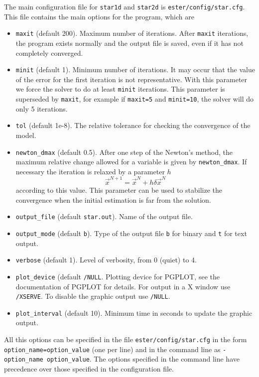 The main configuration file for {\tt star1d} and {\tt star2d} is {\tt ester/config/star.cfg}.
This file contains the main options for the program, which are
\begin{itemize}
\item {\tt maxit} (default 200).
Maximum number of iterations. After {\tt maxit} iterations, the program
exists normally and the output file is saved, even if it has not completely converged.
\item {\tt minit} (default 1).
Minimum number of iterations. It may occur that the value of the error
for the first iteration is not representative. With this parameter we force the solver to
do at least {\tt minit} iterations. This parameter is superseded by {\tt maxit}, for example
if {\tt maxit=5} and {\tt minit=10}, the solver will do only 5 iterations.
\item {\tt tol} (default 1e-8). 
The relative tolerance for checking the convergence of the model.
\item {\tt newton\_dmax} (default 0.5).
After one step of the Newton's method, the maximum relative change
allowed for a variable is given by {\tt newton\_dmax}. If necessary the iteration is relaxed
by a parameter $h$
$$\vec x^{N+1}=\vec x^N+h \delta\vec x^N$$
according to this value.
This parameter can be used to stabilize the convergence when the initial estimation is far
from the solution.
\item {\tt output\_file} (default {\tt star.out}). Name of the output file.
\item {\tt output\_mode} (default {\tt b}). Type of the output file {\tt b} for binary
and {\tt t} for text output.
\item {\tt verbose} (default 1). Level of verbosity, from 0 (quiet) to 4.
\item {\tt plot\_device} (default {\tt /NULL}. Plotting device for PGPLOT, 
see the documentation of PGPLOT for details. For output in a X window use {\tt /XSERVE}.
To disable the graphic output use {\tt /NULL}.
\item {\tt plot\_interval} (default 10). Minimum time in seconds to update the graphic output.
\end{itemize}
All this options can be specified in the file {\tt ester/config/star.cfg} in the form
{\tt option\_name=option\_value} (one per line) and in the command line as 
{\tt -option\_name option\_value}. The options specified in the command line have precedence
over those specified in the configuration file. 

